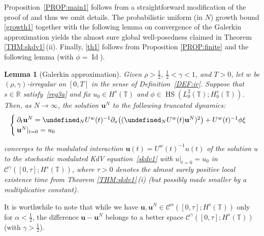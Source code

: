 \documentclass[letterpaper, 11pt,  reqno]{amsart}
\newtheorem{lemma}[theorem]{Lemma}
\DeclareMathOperator{\HS}{HS}
\DeclareMathOperator{\Id}{Id}
\newcommand{\1}{\hspace{0.5mm}\text{I}\hspace{0.5mm}}
\newcommand{\noi}{\noindent}
\newcommand{\R}{\mathbb{R}}
\newcommand{\T}{\mathbb{T}}
\let\P= \undefined
\newcommand{\P}{\mathbf{P}}
\newcommand{\al}{\alpha}
\newcommand{\g}{\gamma}
\newcommand{\dx}{\partial_x}
\newcommand{\dt}{\partial_t}
\newcommand{\cC}{\mathcal{C}}
\newcommand{\uw}{U^w}
\newcommand{\uu}{\mathbf{u}}
\numberwithin{equation}{section}
\numberwithin{theorem}{section}
\begin{document}
Proposition~\ref{PROP:main1}
follows from a straightforward modification of the proof of 
 \cite[Proposition~4.1]{OQS} and thus we omit details.
The probabilistic uniform (in $N$) growth bound
\eqref{growth1}
together with the following lemma
on convergence of the Galerkin approximation 
yields
the almost sure global well-posedness
claimed in 
Theorem \ref{THM:skdv1}\,(ii).
 Finally, \eqref{th1}
 follows from Proposition \ref{PROP:finite}
 and 
the following lemma
(with $\phi = \Id$).
 




\begin{lemma}[Galerkin approximation]\label{LEM:Ga1}
Given $\rho > \frac 12$,  $\frac12< \g < 1$, and $T> 0$, 
let  $w$ be $(\rho,\g)$-irregular on $[0, T]$ in the sense of Definition~\ref{DEF:ir}.
Suppose that  $s \in \R$ satisfy~\eqref{reg3a}
and fix 
 $u_0 \in H^s(\T)$
and  $\phi \in \HS(L^2_0(\T); H^s_0(\T))$.
Then, as $N \to \infty$, 
the solution $\uu^N$
to the following truncated dynamics\textup{:}
\begin{equation}
\label{KdV9}
\begin{cases}
\dt \uu^N = \P_N\uw(t)^{-1} \dx\big( (\P_N \uw(t) \uu^N)^2\big) +  \uw(t)^{-1}\phi \xi\\
\uu^N|_{t = 0} = u_0 
\end{cases}
\end{equation}


\noi
converges to 
the modulated interaction $\uu(t) = \uw(t)^{-1}u(t)$
of the solution $u$
to 
 the stochastic modulated KdV equation~\eqref{skdv1}
 with $u|_{t = 0} = u_0$
in $\cC^\g([0, \tau]; H^s(\T))$, 
where $\tau > 0$ denotes the almost surely positive local existence time
from Theorem \ref{THM:skdv1}\,(i)
\textup{(}but 
possibly  made  smaller by a multiplicative constant\textup{)}. 


\end{lemma}

It is worthwhile to note that while we have $\uu, \uu^N 
\in \cC^\al([0, \tau]; H^s(\T))$
only for   $  \al < \frac 12$, 
the difference 
 $\uu - \uu^N$ 
 belongs to a better space
 $\cC^\g([0, \tau]; H^s(\T))$ (with $\g > \frac 12$).
 
\end{document}
